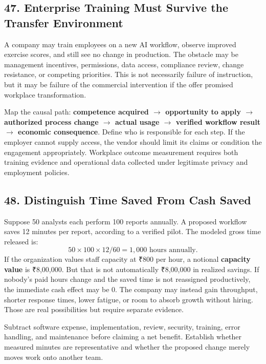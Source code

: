 \subsection*{47. Enterprise Training Must Survive the Transfer Environment}

A company may train employees on a new AI workflow, observe improved exercise scores, and still see no change in production. The obstacle may be management incentives, permissions, data access, compliance review, change resistance, or competing priorities. This is not necessarily failure of instruction, but it may be failure of the commercial intervention if the offer promised workplace transformation.

Map the causal path: \textbf{competence acquired $\to$ opportunity to apply $\to$ authorized process change $\to$ actual usage $\to$ verified workflow result $\to$ economic consequence}. Define who is responsible for each step. If the employer cannot supply access, the vendor should limit its claims or condition the engagement appropriately. Workplace outcome measurement requires both training evidence and operational data collected under legitimate privacy and employment policies.

\subsection*{48. Distinguish Time Saved From Cash Saved}

Suppose 50 analysts each perform 100 reports annually. A proposed workflow saves 12 minutes per report, according to a verified pilot. The modeled gross time released is:
\begin{equation}
50 \times 100 \times 12 / 60 = 1{,}000\text{ hours annually}.
\end{equation}
If the organization values staff capacity at ₹800 per hour, a notional \textbf{capacity value} is ₹8,00,000. But that is not automatically ₹8,00,000 in realized savings. If nobody's paid hours change and the saved time is not reassigned productively, the immediate cash effect may be 0. The company may instead gain throughput, shorter response times, lower fatigue, or room to absorb growth without hiring. Those are real possibilities but require separate evidence.

Subtract software expense, implementation, review, security, training, error handling, and maintenance before claiming a net benefit. Establish whether measured minutes are representative and whether the proposed change merely moves work onto another team.

